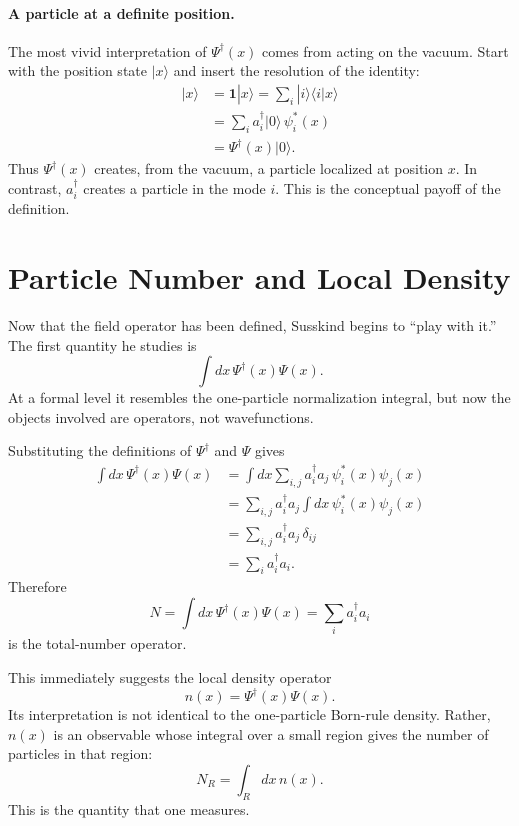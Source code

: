 \paragraph{A particle at a definite position.}
The most vivid interpretation of $\Psi^\dagger(x)$ comes from acting on the vacuum. Start with the position state $|x\rangle$ and insert the resolution of the identity:
\begin{align}
|x\rangle
&=\mathbf{1}|x\rangle
=\sum_i |i\rangle\langle i|x\rangle \\
&=\sum_i a_i^\dagger|0\rangle\,\psi_i^*(x) \\
&=\Psi^\dagger(x)|0\rangle.
\end{align}
Thus $\Psi^\dagger(x)$ creates, from the vacuum, a particle localized at position $x$. In contrast, $a_i^\dagger$ creates a particle in the mode $i$. This is the conceptual payoff of the definition.

\section{Particle Number and Local Density}

Now that the field operator has been defined, Susskind begins to ``play with it.'' The first quantity he studies is
\begin{equation}
\int dx\,\Psi^\dagger(x)\Psi(x).
\end{equation}
At a formal level it resembles the one-particle normalization integral, but now the objects involved are operators, not wavefunctions.

Substituting the definitions of $\Psi^\dagger$ and $\Psi$ gives
\begin{align}
\int dx\,\Psi^\dagger(x)\Psi(x)
&=\int dx\sum_{i,j} a_i^\dagger a_j\,\psi_i^*(x)\psi_j(x) \\
&=\sum_{i,j} a_i^\dagger a_j \int dx\,\psi_i^*(x)\psi_j(x) \\
&=\sum_{i,j} a_i^\dagger a_j\,\delta_{ij} \\
&=\sum_i a_i^\dagger a_i.
\end{align}
Therefore
\begin{equation}
N=\int dx\,\Psi^\dagger(x)\Psi(x)=\sum_i a_i^\dagger a_i
\end{equation}
is the total-number operator.

This immediately suggests the local density operator
\begin{equation}
n(x)=\Psi^\dagger(x)\Psi(x).
\end{equation}
Its interpretation is not identical to the one-particle Born-rule density. Rather, $n(x)$ is an observable whose integral over a small region gives the number of particles in that region:
\begin{equation}
N_R=\int_R dx\,n(x).
\end{equation}
This is the quantity that one measures.


